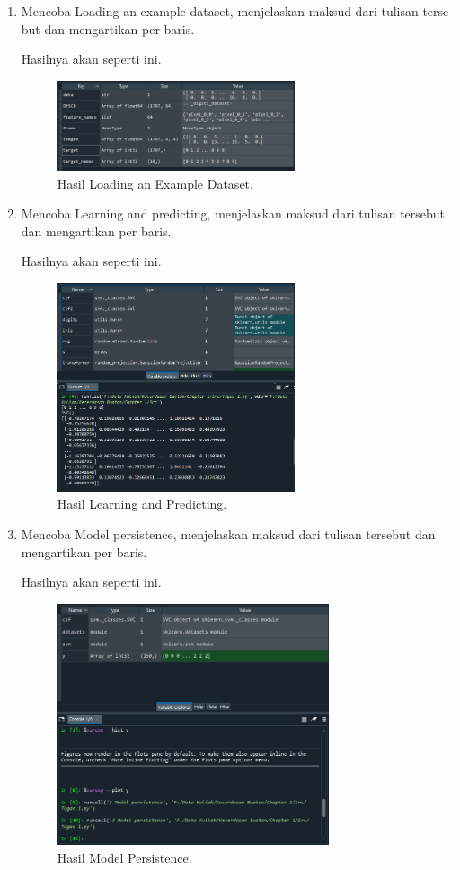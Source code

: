 \begin{enumerate}
	\item Mencoba Loading an example dataset, menjelaskan maksud dari tulisan terse-but dan mengartikan per baris.
	
	
	Hasilnya akan seperti ini.
	\begin{figure}[H]
		\includegraphics[width=7cm]{figures/1184077/chapter1/praktek/hasil1.PNG}
		\centering
		\caption{Hasil Loading an Example Dataset.}
	\end{figure}

	\item Mencoba  Learning  and  predicting,  menjelaskan  maksud  dari  tulisan  tersebut dan mengartikan per baris.
	
	
	Hasilnya akan seperti ini.
	\begin{figure}[H]
		\includegraphics[width=7cm]{figures/1184077/chapter1/praktek/hasil2.PNG}
		\centering
		\caption{Hasil Learning and Predicting.}
	\end{figure}

	\item Mencoba Model persistence, menjelaskan maksud dari tulisan tersebut dan mengartikan per baris.
	
	
	Hasilnya akan seperti ini.
	\begin{figure}[H]
		\includegraphics[width=8cm]{figures/1184077/chapter1/praktek/hasil3.PNG}
		\centering
		\caption{Hasil Model Persistence.}
	\end{figure}


\end{enumerate}
